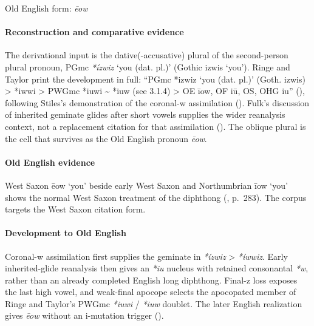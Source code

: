 \documentclass[
  british,
  a4paper,
]{article}
\providecommand{\Recon}[1]{\emph{*#1}}
\begin{document}
Old English form: \emph{ēow}

\paragraph{Reconstruction and comparative
evidence}\label{reconstruction-and-comparative-evidence-75}

The derivational input is the dative(-accusative) plural of the
second-person plural pronoun, PGmc \Recon{ízwiz} `you (dat. pl.)'
(Gothic {izwis} `you'). Ringe and Taylor print the development in full:
``PGmc *izwiz `you (dat. pl.)' (Goth. izwis) \textgreater{} *iwwi
\textgreater{} PWGmc *iuwi \textasciitilde{} *iuw (see 3.1.4)
\textgreater{} OE īow, OF iū, OS, OHG iu''
(),
following Stiles's demonstration of the coronal-w assimilation
(). Fulk's discussion of
inherited geminate glides after short vowels supplies the wider
reanalysis context, not a replacement citation for that assimilation
(). The oblique plural is the
cell that survives as the Old English pronoun \emph{ēow}.

\paragraph{Old English evidence}\label{old-english-evidence-75}

West Saxon {ēow} `you' beside early West Saxon and Northumbrian {īow}
`you' shows the normal West Saxon treatment of the diphthong
(, p.~283). The
corpus targets the West Saxon citation form.

\paragraph{Development to Old
English}\label{development-to-old-english-75}

Coronal-w assimilation first supplies the geminate in \emph{*ízwiz}
\textgreater{} \emph{*íwwiz}. Early inherited-glide reanalysis then
gives an \emph{*iu} nucleus with retained consonantal \emph{*w}, rather
than an already completed English long diphthong. Final-z loss exposes
the last high vowel, and weak-final apocope selects the apocopated
member of Ringe and Taylor's PWGmc \emph{*iuwi} / \emph{*iuw} doublet.
The later English realization gives \emph{ēow} without an i-mutation
trigger ().
\end{document}
